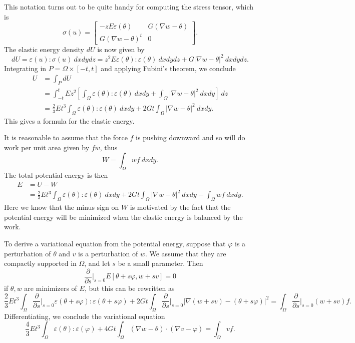\documentclass[10pt]{article}
\theoremstyle{definition}
\begin{document}
This notation turns out to be quite handy for computing the stress tensor, which is
$$\sigma(u) = \begin{bmatrix}-zE\varepsilon(\theta) & G(\nabla w - \theta) \\ G(\nabla w - \theta)^t & 0\end{bmatrix}.$$
The elastic energy density $dU$ is now given by
$$dU = \varepsilon(u):\sigma(u) ~dxdydz = z^2E\varepsilon(\theta):\varepsilon(\theta) ~dxdydz + G|\nabla w - \theta|^2 ~dxdydz.$$
Integrating in $P = \Omega \times [-t, t]$ and applying Fubini's theorem, we conclude
\begin{align*}
U &= \int_P dU \\
&= \int_{-t}^t Ez^2 \left[\int_\Omega \varepsilon(\theta):\varepsilon(\theta) ~dxdy + \int_\Omega |\nabla w - \theta|^2 ~dxdy\right] ~dz \\
&= \frac{2}{3}Et^3 \int_\Omega \varepsilon(\theta):\varepsilon(\theta) ~dxdy + 2Gt \int_\Omega |\nabla w - \theta|^2 ~dxdy.
\end{align*}
This gives a formula for the elastic energy.

It is reasonable to assume that the force $f$ is pushing downward and so will do work per unit area given by $fw$, thus
$$W = \int_\Omega wf ~dxdy.$$
The total potential energy is then
\begin{align*}
E &= U - W\\
&= \frac{2}{3}Et^3 \int_\Omega \varepsilon(\theta):\varepsilon(\theta) ~dxdy + 2Gt \int_\Omega |\nabla w - \theta|^2 ~dxdy - \int_\Omega wf ~dxdy.
\end{align*}
Here we know that the minus sign on $W$ is motivated by the fact that the potential energy will be minimized when the elastic energy is balanced by the work.

To derive a variational equation from the potential energy, suppose that $\varphi$ is a perturbation of $\theta$ and $v$ is a perturbation of $w$.
We assume that they are compactly supported in $\Omega$, and let $s$ be a small parameter. Then
$$\frac{\partial}{\partial s}\bigg|_{s = 0} E[\theta + s\varphi, w + sv] = 0$$
if $\theta,w$ are minimizers of $E$, but this can be rewritten as
$$\frac{2}{3} Et^3 \int_\Omega \frac{\partial}{\partial s}\bigg|_{s = 0} \varepsilon(\theta + s\varphi):\varepsilon(\theta + s\varphi)
+ 2Gt \int_\Omega \frac{\partial}{\partial s}\bigg|_{s = 0} |\nabla(w + sv) - (\theta + s\varphi)|^2 = \int_\Omega \frac{\partial}{\partial s}\bigg|_{s = 0} (w + sv)f.$$
Differentiating, we conclude the variational equation
$$\frac{4}{3} Et^3 \int_\Omega \varepsilon(\theta):\varepsilon(\varphi) + 4Gt \int_\Omega (\nabla w - \theta) \cdot (\nabla v - \varphi) = \int_\Omega vf.$$
\end{document}
